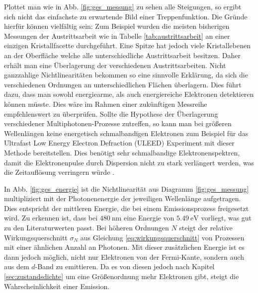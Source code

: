 \documentclass[bachelor,       %
               twoside,        %
               BCOR10mm,       %
               english,ngerman, %
               ]{GAUBM}
\begin{document}
Plottet man wie in Abb. \ref{fig:ges_messung} zu sehen alle Steigungen, so ergibt sich nicht das einfachste zu erwartende Bild einer Treppenfunktion.
Die Gründe hierfür können vielfältig sein: Zum Beispiel wurden die meisten bisherigen Messungen der Austrittsarbeit wie in Tabelle \ref{tab:austrittsarbeit} an einer einzigen Kristallfacette durchgeführt.
Eine Spitze hat jedoch viele Kristallebenen an der Oberfläche welche alle unterschiedliche Austrittsarbeit besitzen.
Daher erhält man eine Überlagerung der verschiedenen Austrittsarbeiten.
Nicht ganzzahlige Nichtlinearitäten bekommen so eine sinnvolle Erklärung, da sich die verschiedenen Ordnungen an unterschiedlichen Flächen überlagern.
Dies führt dazu, dass man sowohl energiearme, als auch energiereiche Elektronen detektieren können müsste.
Dies wäre im Rahmen einer zukünftigen Messreihe empfehlenswert zu überprüfen.
Sollte die Hypothese der Überlagerung verschiedener Multiphotonen-Prozesse zutreffen, so kann man bei größeren Wellenlängen keine energetisch schmalbandigen Elektronen zum Beispiel für das Ultrafast Low Energy Electron Defraction (ULEED) Experiment mit dieser Methode bereitstellen.
Dies benötigt sehr schmalbandige Elektronenspektren, damit die Elektronenpulse durch Dispersion nicht zu stark verlängert werden, was die Zeitauflösung verringern würde \cite{gahlmann_2008}.

In Abb. \ref{fig:ges_energie} ist die Nichtlinearität aus Diagramm \ref{fig:ges_messung} multipliziert mit der Photonenenergie der jeweiligen Wellenlänge aufgetragen.
Dies entspricht der mittleren Energie, die bei einem Emissionsprozess freigesetzt wird.
Zu erkennen ist, dass bei $\SI{480}{\nano\meter}$ eine Energie von $\SI{5.49}\electronvolt$ vorliegt, was gut zu den Literaturwerten passt.
Bei höheren Ordnungen $N$ steigt der relative Wirkungsquerschnitt $\sigma_N$ aus Gleichung \ref{eq:wirkungsquerschnitt} von Prozessen mit einer ähnlichen Anzahl an Photonen.
Mit dieser zusätzlichen Energie ist es dann jedoch möglich, nicht nur Elektronen von der Fermi-Kante, sondern auch aus dem $d$-Band zu emittieren.
Da es von diesen jedoch nach Kapitel \ref{sec:zustandsdichte} um eine Größenordnung mehr Elektronen gibt, steigt die Wahrscheinlichkeit einer Emission.\newline\newline
\end{document}
